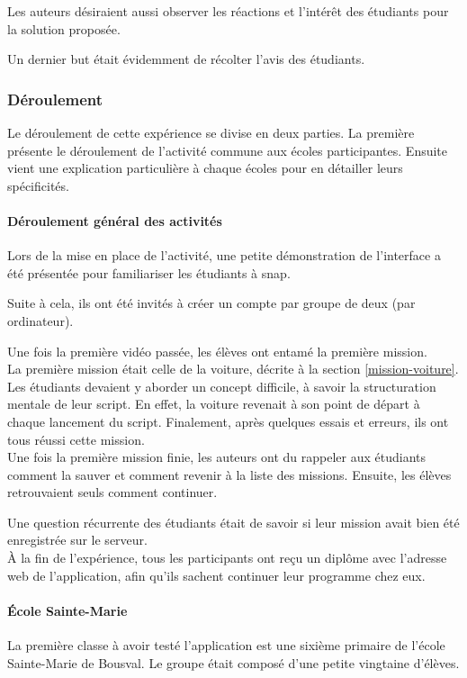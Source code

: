 Les auteurs désiraient aussi observer les réactions et l'intérêt des étudiants pour la solution proposée.

Un dernier but était évidemment de récolter l'avis des étudiants.

\subsubsection{Déroulement}
Le déroulement de cette expérience se divise en deux parties. La première présente le déroulement de l'activité commune aux écoles participantes. Ensuite vient une explication particulière à chaque écoles pour en détailler leurs spécificités.
\paragraph{Déroulement général des activités}
Lors de la mise en place de l'activité, une petite démonstration de l'interface a été présentée pour familiariser les étudiants à \gls{snap}.

Suite à cela, ils ont été invités à créer un compte par groupe de deux (par ordinateur).

Une fois la première vidéo passée, les élèves ont entamé la première mission.\\

La première mission était celle de la voiture, décrite à la section \ref{mission-voiture}. Les étudiants devaient y aborder un concept difficile, à savoir la structuration mentale de leur \gls{script}. En effet, la voiture revenait à son point de départ à chaque lancement du \gls{script}. Finalement, après quelques essais et erreurs, ils ont tous réussi cette mission.\\

Une fois la première mission finie, les auteurs ont du rappeler aux étudiants comment la sauver et comment revenir à la liste des missions. Ensuite, les élèves retrouvaient seuls comment continuer.

Une question récurrente des étudiants était de savoir si leur mission avait bien été enregistrée sur le serveur.\\

À la fin de l'expérience, tous les participants ont reçu un diplôme avec l'adresse web de l'application, afin qu'ils sachent continuer leur programme chez eux.

\paragraph{École Sainte-Marie}
La première classe à avoir testé l'application est une sixième primaire de l'école Sainte-Marie de Bousval. Le groupe était composé d'une petite vingtaine d'élèves.


